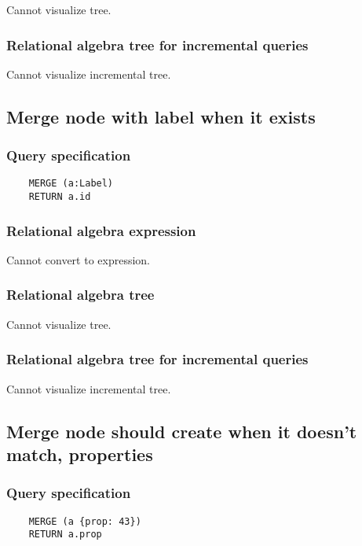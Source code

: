 	Cannot visualize tree.

	\subsubsection*{Relational algebra tree for incremental queries}

	Cannot visualize incremental tree.
	\subsection{Merge node with label when it exists}

	\subsubsection*{Query specification}

	\begin{lstlisting}
	MERGE (a:Label)
	RETURN a.id
	\end{lstlisting}


	\subsubsection*{Relational algebra expression}

	Cannot convert to expression.

	\subsubsection*{Relational algebra tree}

	Cannot visualize tree.

	\subsubsection*{Relational algebra tree for incremental queries}

	Cannot visualize incremental tree.
	\subsection{Merge node should create when it doesn't match, properties}

	\subsubsection*{Query specification}

	\begin{lstlisting}
	MERGE (a {prop: 43})
	RETURN a.prop
	\end{lstlisting}


